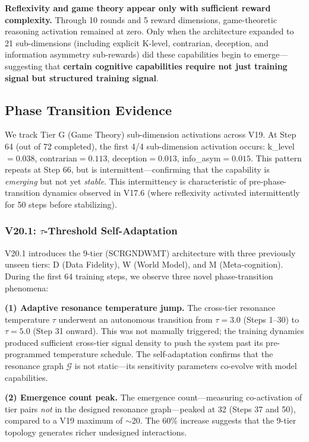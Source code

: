 \documentclass[sigconf]{acmart}
\begin{document}
\textbf{Reflexivity and game theory appear only with sufficient reward complexity.} Through 10 rounds and 5 reward dimensions, game-theoretic reasoning activation remained at zero. Only when the architecture expanded to 21 sub-dimensions (including explicit K-level, contrarian, deception, and information asymmetry sub-rewards) did these capabilities begin to emerge---suggesting that \textbf{certain cognitive capabilities require not just training signal but structured training signal}.

\subsection{Phase Transition Evidence}

We track Tier G (Game Theory) sub-dimension activations across V19. At Step 64 (out of 72 completed), the first 4/4 sub-dimension activation occurs: k\_level$=0.038$, contrarian$=0.113$, deception$=0.013$, info\_asym$=0.015$. This pattern repeats at Step 66, but is intermittent---confirming that the capability is \textit{emerging} but not yet \textit{stable}. This intermittency is characteristic of pre-phase-transition dynamics observed in V17.6 (where reflexivity activated intermittently for 50 steps before stabilizing).

\subsubsection{V20.1: $\tau$-Threshold Self-Adaptation}

V20.1 introduces the 9-tier (SCRGNDWMT) architecture with three previously unseen tiers: D (Data Fidelity), W (World Model), and M (Meta-cognition). During the first 64 training steps, we observe three novel phase-transition phenomena:

\textbf{(1) Adaptive resonance temperature jump.} The cross-tier resonance temperature $\tau$ underwent an autonomous transition from $\tau=3.0$ (Steps 1--30) to $\tau=5.0$ (Step 31 onward). This was not manually triggered; the training dynamics produced sufficient cross-tier signal density to push the system past its pre-programmed temperature schedule. The self-adaptation confirms that the resonance graph $\mathcal{G}$ is not static---its sensitivity parameters co-evolve with model capabilities.

\textbf{(2) Emergence count peak.} The emergence count---measuring co-activation of tier pairs \textit{not} in the designed resonance graph---peaked at 32 (Steps 37 and 50), compared to a V19 maximum of $\sim$20. The 60\% increase suggests that the 9-tier topology generates richer undesigned interactions.
\end{document}
